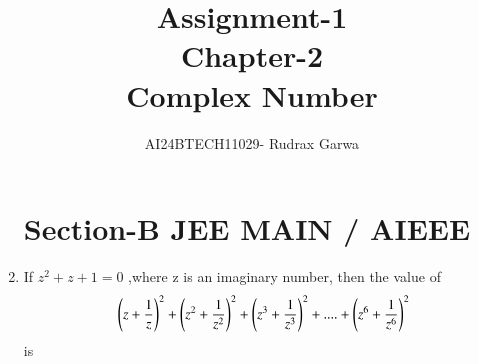 \documentclass[journal,12pt,twocolumn,article]{IEEEtran}
\theoremstyle{remark}
\begin{document}
                                   
\begin{enumerate}[start = 14]                      

                                      
\title{Assignment-1 \\Chapter-2\\Complex Number}
\author{AI24BTECH11029- Rudrax Garwa}              
\maketitle
\newpage                                           
\bigskip
\section*{Section-B   JEE MAIN / AIEEE}
\item If $z^2+z+1=0$ ,where z is an imaginary number, then the value of
\begin{align}
\left(z+\frac{1}{z}\right)^2 + \left(z^2+\frac{1}{z^2}\right)^2 + \left(z^3 +\frac{1}{z^3}\right)^2 +....+\left(z^6 +\frac{1}{z^6}\right)^2
\end{align} 
is


\end{enumerate}
\end{document}
